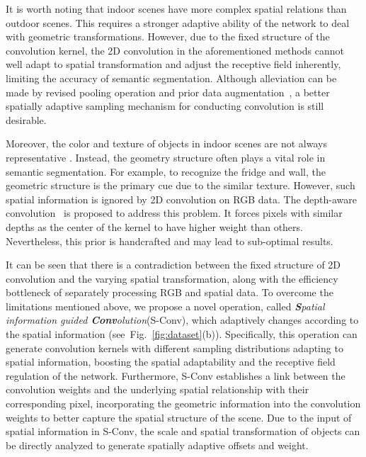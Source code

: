 \documentclass[journal]{IEEEtran}
\newcommand{\figref}[1]{Fig.~\ref{#1}}
\begin{document}
It is worth noting that indoor scenes have more complex
spatial relations than outdoor scenes.
This requires a stronger adaptive ability 
of the network to deal with geometric transformations.
However, due to the fixed structure of
the convolution kernel, the 2D convolution in the
aforementioned methods cannot well adapt to spatial transformation
and adjust the receptive field inherently, 
limiting the accuracy of semantic segmentation.
Although alleviation can be made by revised pooling operation and
prior data augmentation~\cite{deform, deformablev2},
a better spatially adaptive sampling mechanism for conducting 
convolution is still desirable.


Moreover, the color and texture of objects in indoor scenes
are not always representative \cite{BorjiCVM2019}.
Instead, the geometry structure often plays a vital role
in semantic segmentation.
For example, to recognize the fridge and wall,
the geometric structure is the primary cue due to the similar texture.
However, such spatial information is ignored by 2D convolution on RGB data.
The depth-aware convolution~\cite{dcnn} is proposed to address this problem. 
It forces pixels with similar
depths as the center of the kernel to have higher weight than others.
Nevertheless, this prior is handcrafted and may lead to
sub-optimal results.





It can be seen that there is a contradiction
between the fixed structure of 2D convolution 
and the varying spatial transformation,
along with the efficiency bottleneck of 
separately processing RGB and spatial data.
To overcome the limitations mentioned above,
we propose a novel operation, called
\emph{\textbf{S}patial information 
guided \textbf{Conv}olution}(S-Conv),
which adaptively changes according to 
the spatial information (see~\figref{fig:dataset}(b)).
Specifically, this operation can generate convolution
kernels with different sampling distributions 
adapting to spatial information,
boosting the spatial adaptability and the 
	receptive field regulation of the network.
Furthermore, S-Conv establishes a link
between the convolution weights and the underlying spatial
relationship with their corresponding pixel, incorporating
the geometric information into the convolution weights to
better capture the spatial structure of the scene.
Due to the input of spatial information in S-Conv, 
the scale and spatial transformation of objects can be directly 
analyzed to generate spatially adaptive offsets and weight.
\end{document}

